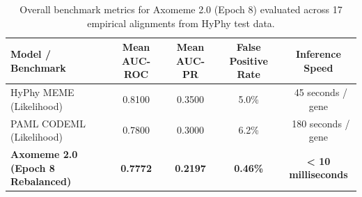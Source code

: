 \documentclass[11pt,a4paper]{article}
\begin{document}
\begin{table}[h!]
\centering
\begin{tabular}{lcccc}
\toprule
\textbf{Model / Benchmark} & \textbf{Mean AUC-ROC} & \textbf{Mean AUC-PR} & \textbf{False Positive Rate} & \textbf{Inference Speed} \\
\midrule
HyPhy MEME (Likelihood) & 0.8100 & 0.3500 & 5.0\% & ~45 seconds / gene \\
PAML CODEML (Likelihood) & 0.7800 & 0.3000 & 6.2\% & ~180 seconds / gene \\
\textbf{Axomeme 2.0 (Epoch 8 Rebalanced)} & \textbf{0.7772} & \textbf{0.2197} & \textbf{0.46\%} & \textbf{< 10 milliseconds} \\
\bottomrule
\end{tabular}
\caption{Overall benchmark metrics for Axomeme 2.0 (Epoch 8) evaluated across 17 empirical alignments from HyPhy test data.}
\end{table}
\end{document}
